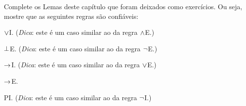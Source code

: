 \practiceproblems

\problempart
\label{pr.Soundness}
Complete os Lemas deste capítulo que foram deixados como exercícios.
Ou seja, mostre que as seguintes regras são confiáveis:
	\begin{earg}
		\item $\vee$I. (\emph{Dica}: este é um caso similar ao da regra $\wedge$E.)
		\item $\bot$E. (\emph{Dica}: este é um caso similar ao da regra $\neg$E.)
		\item $\rightarrow$I. (\emph{Dica}: este é um caso similar ao da regra $\vee$E.)
		\item $\rightarrow$E.
		\item PI. (\emph{Dica}: este é um caso similar ao da regra $\neg$I.)
	\end{earg}

